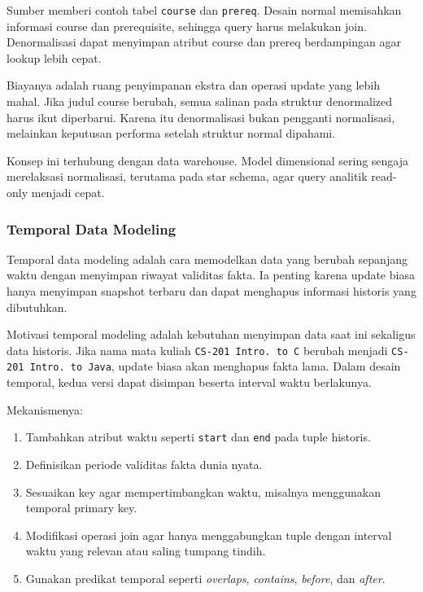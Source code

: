 Sumber memberi contoh tabel \texttt{course} dan \texttt{prereq}. Desain normal memisahkan informasi course dan prerequisite, sehingga query harus melakukan join. Denormalisasi dapat menyimpan atribut course dan prereq berdampingan agar lookup lebih cepat.

Biayanya adalah ruang penyimpanan ekstra dan operasi update yang lebih mahal. Jika judul course berubah, semua salinan pada struktur denormalized harus ikut diperbarui. Karena itu denormalisasi bukan pengganti normalisasi, melainkan keputusan performa setelah struktur normal dipahami.

Konsep ini terhubung dengan data warehouse. Model dimensional sering sengaja merelaksasi normalisasi, terutama pada star schema, agar query analitik read-only menjadi cepat.

\subsubsection{Temporal Data Modeling}

\begin{jawab}
Temporal data modeling adalah cara memodelkan data yang berubah sepanjang waktu dengan menyimpan riwayat validitas fakta. Ia penting karena update biasa hanya menyimpan snapshot terbaru dan dapat menghapus informasi historis yang dibutuhkan.
\end{jawab}

Motivasi temporal modeling adalah kebutuhan menyimpan data saat ini sekaligus data historis. Jika nama mata kuliah \texttt{CS-201 Intro. to C} berubah menjadi \texttt{CS-201 Intro. to Java}, update biasa akan menghapus fakta lama. Dalam desain temporal, kedua versi dapat disimpan beserta interval waktu berlakunya.

Mekanismenya:
\begin{enumerate}
    \item Tambahkan atribut waktu seperti \texttt{start} dan \texttt{end} pada tuple historis.
    \item Definisikan periode validitas fakta dunia nyata.
    \item Sesuaikan key agar mempertimbangkan waktu, misalnya menggunakan temporal primary key.
    \item Modifikasi operasi join agar hanya menggabungkan tuple dengan interval waktu yang relevan atau saling tumpang tindih.
    \item Gunakan predikat temporal seperti \textit{overlaps}, \textit{contains}, \textit{before}, dan \textit{after}.
\end{enumerate}

